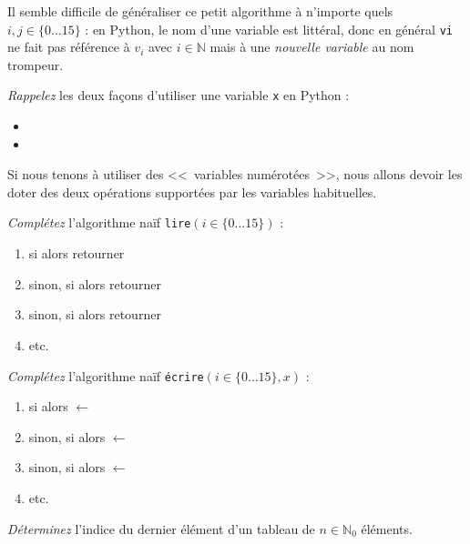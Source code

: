 Il semble difficile de généraliser ce petit algorithme à n'importe quels
$i,j \in \{0\dots15\}$ : en Python, le nom d'une variable est littéral, donc
en général
\texttt{vi} ne fait pas référence à $v_i$ avec $i\in\mathbb{N}$ mais à une
\emph{nouvelle variable} au nom trompeur.

\begin{exo}
\emph{Rappelez} les deux façons d'utiliser une variable \texttt{x} en Python :
\begin{itemize}
\item {}
\item {}
\end{itemize}
\end{exo}

Si nous tenons à utiliser des <<~variables numérotées~>>, nous allons devoir
les doter des deux opérations supportées par les variables habituelles.

\begin{exo}
\emph{Complétez} l'algorithme naïf \texttt{lire}$(i\in\{0\dots15\})$ :
\begin{enumerate}
\item si  alors retourner 
\item sinon, si  alors retourner 
\item sinon, si  alors retourner 
\item etc.
\end{enumerate}
\end{exo}

\begin{exo}
\emph{Complétez} l'algorithme naïf \texttt{écrire}$(i\in\{0\dots15\}, x)$ :
\begin{enumerate}
\item si  alors
	 $\leftarrow$ 
\item sinon, si  alors
	 $\leftarrow$ 
\item sinon, si  alors
	 $\leftarrow$ 
\item etc.
\end{enumerate}
\end{exo}

\begin{exo}
\emph{Déterminez} l'indice du dernier élément d'un tableau de
$n\in\mathbb{N}_0$ éléments.
\end{exo}

